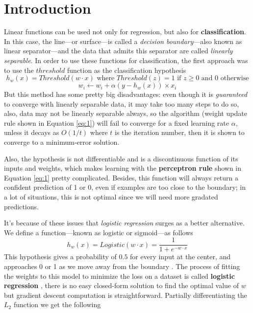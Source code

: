 \documentclass[10pt]{article}
\begin{document}
\section{Introduction}
Linear functions can be used not only for regression, but also for \textbf{classification}. In this case, the line---or surface---is called a \textit{decision boundary}---also known as linear separator---and the data that admits this separator are called \textit{linearly separable}. \cite{ai} In order to use these functions for classification, the first approach was to use the $threshold$ function as the classification hypothesis
\begin{equation*}
  h_{w}(x) = Threshold(w \cdot x) \text{ where } Threshold(z) = 1 \text{ if } z \geq 0 \text{ and } 0 \text{ otherwise}
\end{equation*}
\begin{equation} \label{eq:1}
  w_{i} \leftarrow w_{i} + \alpha (y - h_{w}(x)) \times x_{i}
\end{equation}
But this method has some pretty big disadvantages: even though it is \textit{guaranteed} to converge with linearly separable data, it may take too many steps to do so, also, data may not be linearly separable always, so the algorithm (weight update rule shown in Equation \ref{eq:1}) will fail to converge for a fixed learning rate $\alpha$, unless it decays as $O(1/t)$ where $t$ is the iteration number, then it is shown to converge to a minimum-error solution. \cite{ai} \par
Also, the hypothesis is not differentiable and is a discontinuous function of its inputs and weights, which makes learning with the \textbf{perceptron rule} shown in Equation \ref{eq:1} pretty complicated. Besides, this function will always return a confident prediction of 1 or 0, even if examples are too close to the boundary; in a lot of situations, this is not optimal since we will need more gradated predictions. \cite{ai} \par
It's because of these issues that \textit{logistic regression} surges as a better alternative. We define a function---known as logistic or sigmoid---as follows
\begin{equation*}
  h_{w}(x) = Logistic(w \cdot x) = \frac{1}{1 + e^{-w \cdot x}}
\end{equation*}
This hypothesis gives a probability of $0.5$ for every input at the center, and approaches 0 or 1 as we move away from the boundary \cite{ai}. The process of fitting the weights to this model to minimize the loss on a dataset is called \textbf{logistic regression} \cite{ai}, there is no easy closed-form solution to find the optimal value of $w$ but gradient descent computation is straightforward. Partially differentiating the $L_{2}$ function we get the following
\end{document}
